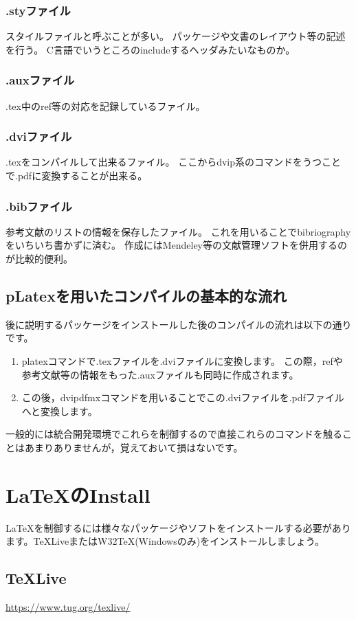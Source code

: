 \documentclass[10pt,a4paper,oneside,twocolumn,fleqn,dvipdfmx]{jsarticle}
\begin{document}
\subsubsection*{.styファイル}
スタイルファイルと呼ぶことが多い。
パッケージや文書のレイアウト等の記述を行う。
C言語でいうところのincludeするヘッダみたいなものか。
\subsubsection*{.auxファイル}
.tex中のref等の対応を記録しているファイル。
\subsubsection*{.dviファイル}
.texをコンパイルして出来るファイル。
ここからdvip系のコマンドをうつことで.pdfに変換することが出来る。
\subsubsection*{.bibファイル}
参考文献のリストの情報を保存したファイル。
これを用いることでbibriographyをいちいち書かずに済む。
作成にはMendeley等の文献管理ソフトを併用するのが比較的便利。

\subsection{pLatexを用いたコンパイルの基本的な流れ}
後に説明するパッケージをインストールした後のコンパイルの流れは以下の通りです。
\begin{enumerate}
\item platexコマンドで.texファイルを.dviファイルに変換します。
この際，refや参考文献等の情報をもった.auxファイルも同時に作成されます。
\item この後，dvipdfmxコマンドを用いることでこの.dviファイルを.pdfファイルへと変換します。
\end{enumerate}
一般的には統合開発環境でこれらを制御するので直接これらのコマンドを触ることはあまりありませんが，覚えておいて損はないです。

\section{\LaTeX のInstall}
\LaTeX を制御するには様々なパッケージやソフトをインストールする必要があります。TeXLiveまたはW32TeX(Windowsのみ)をインストールしましょう。

\subsection{TeXLive}
\url{https://www.tug.org/texlive/}
\end{document}
